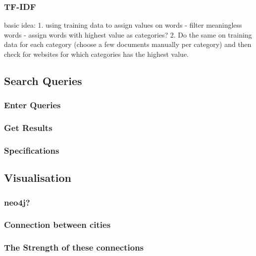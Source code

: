 \subsubsection{TF-IDF}
basic idea: 1. using training data to assign values on words - filter meaningless words - assign words with highest value as categories? 2. Do the same on training data for each category (choose a few documents manually per category) and then check for websites for which categories has the highest value.

\subsection{Search Queries}

\subsubsection{Enter Queries}
\subsubsection{Get Results}
\subsubsection{Specifications}

\subsection{Visualisation}
\subsubsection{neo4j?}

\subsubsection{Connection between cities}
\subsubsection{The Strength of these connections}